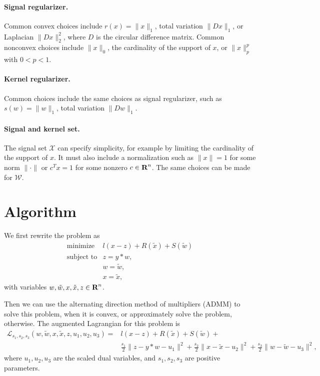 \documentclass[12pt]{article}
\begin{document}
\paragraph{Signal regularizer.}
Common convex choices include
$r(x) = \|x\|_1$, total variation $\|Dx\|_1$, or Laplacian $\|Dx\|_2^2$, where $D$ is the
circular difference matrix.
Common nonconvex choices include $\|x\|_0$, the cardinality of the support of $x$, or 
$\|x\|_p^p$ with $0<p<1$.


\paragraph{Kernel regularizer.} 
Common choices include the same choices as signal regularizer, such as $s(w) = \|w\|_1$, total variation $\|Dw\|_1$. 

\paragraph{Signal and kernel set.}
The signal set  $\mathcal X$ can specify simplicity, for example by limiting the cardinality
of the support of $x$.  It must also include a normalization such as 
$\|x\|=1$ for some norm $\|\cdot \|$ or $c^Tx=1$ for some nonzero $c\in {\mbox{\bf R}}^n$.
The same choices can be made for $\mathcal W$.

\section{Algorithm}
We first rewrite the problem as
\[
\begin{array}{ll}
\mbox{minimize}   & l(x-z)+R(\tilde{x})+ S(\tilde{w}) \\
\mbox{subject to}  & z = y*w,\\
& w = \tilde{w},\\
& x = \tilde{x},
\end{array}
\]
with variables $w, \tilde{w}, x, \tilde{x}, z\in {\mbox{\bf R}}^n$.

Then we can use the alternating direction method of multipliers (ADMM) to solve this problem,
when it is convex, or approximately solve the problem, otherwise.
The augmented Lagrangian for this problem is 
\[
\begin{array}{ll}
 \mathcal{L}_{s_1, s_2,s_3}(w, \tilde{w},x, \tilde{x}, z, u_1, u_2, u_3)=& l(x-z)+R(\tilde{x})+ S(\tilde{w})+\\
 & \frac{s_1}{2} \| z -y*w -u_1\|^2 +
 \frac{s_2}{2} \| x- \tilde{x}-u_2\|^2+
 \frac{s_3}{2} \| w- \tilde{w}-u_3\|^2,
\end{array}
\]
where $u_1, u_2, u_3$ are the scaled dual variables, and $s_1, s_2,s_3$ are positive parameters.
\end{document}
